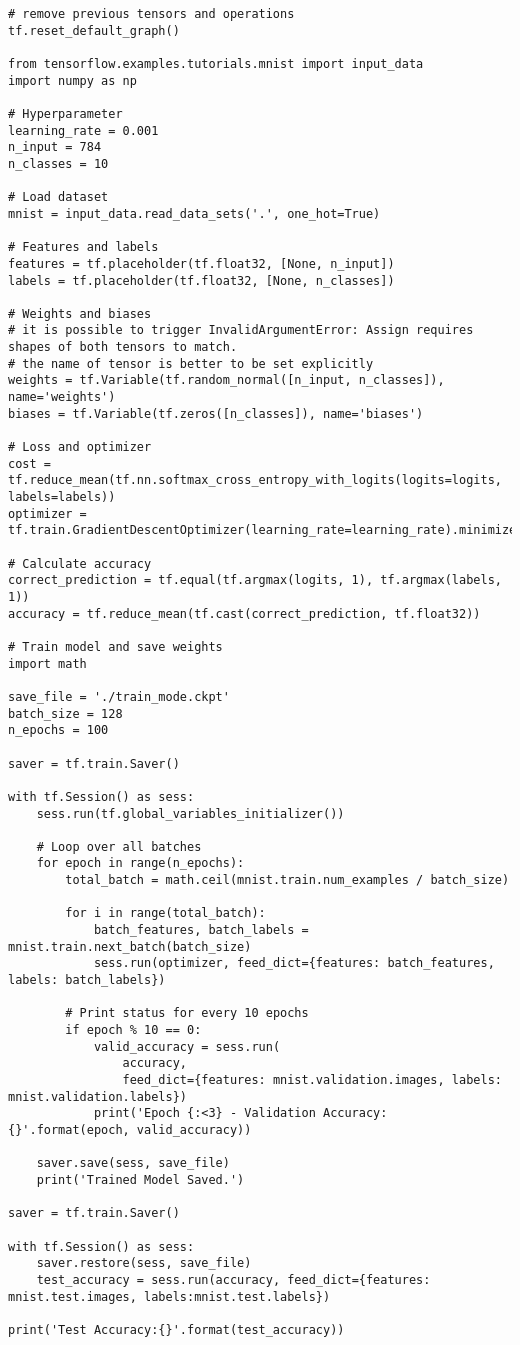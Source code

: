 \documentclass{article}
\begin{document}
\begin{lstlisting}
# remove previous tensors and operations
tf.reset_default_graph()

from tensorflow.examples.tutorials.mnist import input_data
import numpy as np

# Hyperparameter
learning_rate = 0.001
n_input = 784
n_classes = 10

# Load dataset
mnist = input_data.read_data_sets('.', one_hot=True)

# Features and labels
features = tf.placeholder(tf.float32, [None, n_input])
labels = tf.placeholder(tf.float32, [None, n_classes])

# Weights and biases
# it is possible to trigger InvalidArgumentError: Assign requires shapes of both tensors to match.
# the name of tensor is better to be set explicitly
weights = tf.Variable(tf.random_normal([n_input, n_classes]), name='weights')
biases = tf.Variable(tf.zeros([n_classes]), name='biases')

# Loss and optimizer
cost = tf.reduce_mean(tf.nn.softmax_cross_entropy_with_logits(logits=logits, labels=labels))
optimizer = tf.train.GradientDescentOptimizer(learning_rate=learning_rate).minimize(cost)

# Calculate accuracy
correct_prediction = tf.equal(tf.argmax(logits, 1), tf.argmax(labels, 1))
accuracy = tf.reduce_mean(tf.cast(correct_prediction, tf.float32))

# Train model and save weights
import math

save_file = './train_mode.ckpt'
batch_size = 128
n_epochs = 100

saver = tf.train.Saver()

with tf.Session() as sess:
	sess.run(tf.global_variables_initializer())

	# Loop over all batches
	for epoch in range(n_epochs):
		total_batch = math.ceil(mnist.train.num_examples / batch_size)

		for i in range(total_batch):
			batch_features, batch_labels = mnist.train.next_batch(batch_size)
			sess.run(optimizer, feed_dict={features: batch_features, labels: batch_labels})

		# Print status for every 10 epochs
		if epoch % 10 == 0:
			valid_accuracy = sess.run(
				accuracy,
				feed_dict={features: mnist.validation.images, labels: mnist.validation.labels})
			print('Epoch {:<3} - Validation Accuracy: {}'.format(epoch, valid_accuracy))

	saver.save(sess, save_file)
	print('Trained Model Saved.')

saver = tf.train.Saver()

with tf.Session() as sess:
	saver.restore(sess, save_file)
	test_accuracy = sess.run(accuracy, feed_dict={features: mnist.test.images, labels:mnist.test.labels})

print('Test Accuracy:{}'.format(test_accuracy))
\end{lstlisting}
\end{document}
